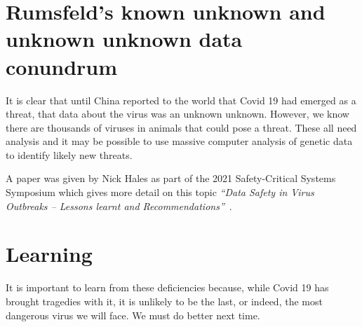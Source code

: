 \section{Rumsfeld’s known unknown and unknown unknown data conundrum}

It is clear that until China reported to the world that Covid 19 had emerged as a threat, that data about the virus was an unknown unknown. However, we know there are thousands of viruses in animals that could pose a threat. These all need analysis and it may be possible to use massive computer analysis of genetic data to identify likely new threats. 
	
A paper was
given by Nick Hales as part of the 2021 Safety-Critical Systems Symposium which gives more detail on this topic {\it“Data Safety in Virus Outbreaks -- Lessons learnt and Recommendations”}~\cite{citation:SCSC161}.

\section{Learning}

It is important to learn from these deficiencies because, while Covid 19 has brought tragedies with it, it is unlikely to be the last, or indeed, the most dangerous virus we will face. We must do better next time.
